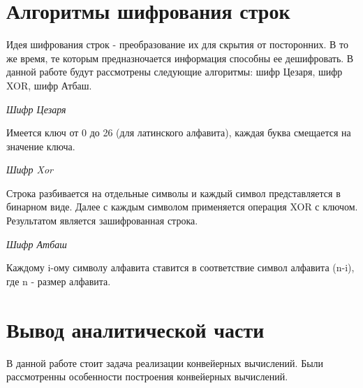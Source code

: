 \section{Алгоритмы шифрования строк}\label{ChoiseSort}

Идея шифрования строк - преобразование их для скрытия от посторонних. В то же время, те которым предназночается информация способны
ее дешифровать.
В данной работе будут рассмотрены следующие алгоритмы: шифр Цезаря, шифр XOR, шифр Атбаш.

\textit{Шифр Цезаря}

Имеется ключ от 0 до 26 (для латинского алфавита), каждая буква смещается на значение ключа.

\textit{Шифр Xor}

Строка разбивается на отдельные символы и каждый символ представляется в бинарном виде. Далее с каждым
символом применяется операция XOR с ключом. Результатом является зашифрованная строка.

\textit{Шифр Атбаш}

Каждому i-ому символу алфавита ставится в соответствие символ алфавита (n-i), где n - размер алфавита.

\section{Вывод аналитической части}\label{End_analis_chapter}

В данной работе стоит задача реализации конвейерных вычислений. Были рассмотренны особенности построения конвейерных вычислений.

